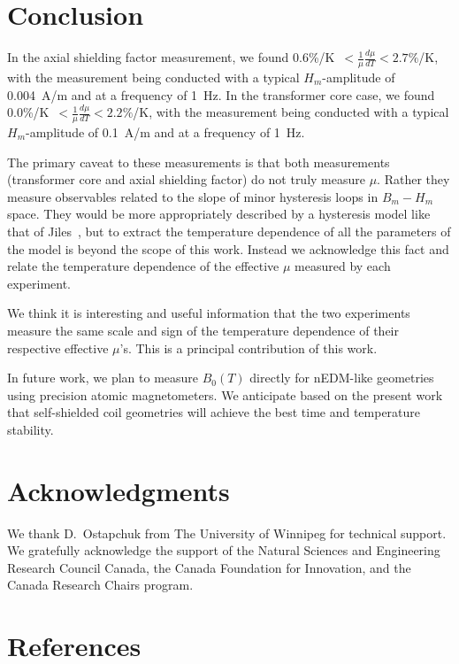 \documentclass[review,number,sort&compress]{elsarticle}
\begin{document}
\section{Conclusion}

In the axial shielding factor measurement, we found
0.6\%/K~$<\frac{1}{\mu}\frac{d\mu}{dT}<2.7\%$/K, with the measurement
being conducted with a typical $H_m$-amplitude of 0.004~A/m and at a
frequency of 1~Hz.  In the transformer core case, we found
0.0\%/K~$<\frac{1}{\mu}\frac{d\mu}{dT}<2.2\%$/K, with the measurement
being conducted with a typical $H_m$-amplitude of 0.1~A/m and at a
frequency of 1~Hz.

The primary caveat to these measurements is that both measurements
(transformer core and axial shielding factor) do not truly measure
$\mu$.  Rather they measure observables related to the slope of minor
hysteresis loops in $B_m-H_m$ space.  They would be more appropriately
described by a hysteresis model like that of Jiles~\cite{bib:jiles},
but to extract the temperature dependence of all the parameters of the
model is beyond the scope of this work.  Instead we acknowledge this
fact and relate the temperature dependence of the effective $\mu$
measured by each experiment.

We think it is interesting and useful information that the two
experiments measure the same scale and sign of the temperature
dependence of their respective effective $\mu$'s.  This is a principal
contribution of this work.

In future work, we plan to measure $B_0(T)$ directly for nEDM-like
geometries using precision atomic magnetometers.  We anticipate based
on the present work that self-shielded coil geometries will achieve
the best time and temperature stability.



\section{Acknowledgments}

We thank D.~Ostapchuk from The University of Winnipeg for technical
support.  We gratefully acknowledge the support of the Natural
Sciences and Engineering Research Council Canada, the Canada
Foundation for Innovation, and the Canada Research Chairs program.


\section*{References}
\end{document}
